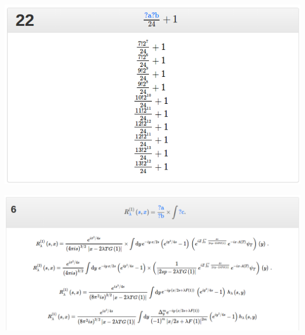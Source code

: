\documentclass{beamer}
\begin{document}
\begin{frame}
    \includegraphics[width=\textwidth]{img/schemaInstGood}
\end{frame}
\begin{frame}
    \includegraphics[width=\textwidth]{img/schemaInstGood3}
\end{frame}
\end{document}
